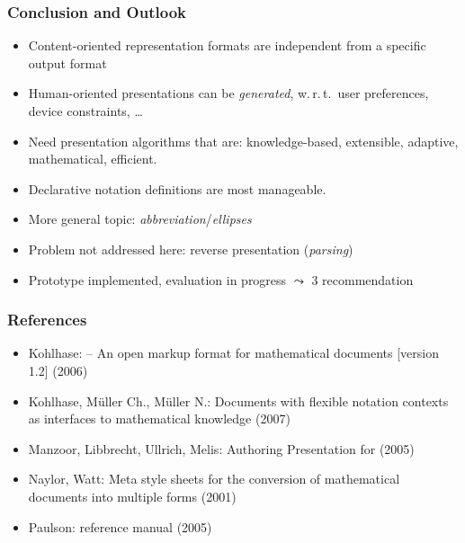 \documentclass[pdftex,xcolor=svgnames]{beamer}
\newcommand{\ExprColor}[1]{\textcolor[RGB]{38,134,102}{#1}}%
\begin{document}
\begin{frame}
  \frametitle{Conclusion and Outlook}
  \begin{itemize}
  \item Content-oriented representation formats are independent from a specific
    output format
  \item Human-oriented presentations can be \emph{generated}, w.\,r.\,t.\ user
    preferences, device constraints, \ldots
  \item Need presentation algorithms that are: knowledge-based, extensible,
    adaptive, mathematical, efficient.
  \item \ExprColor{Declarative} notation definitions are most manageable.
  \item More general topic: \emph{abbreviation}/\emph{ellipses}
  \item Problem not addressed here: reverse presentation (\emph{parsing})
  \item Prototype implemented, evaluation in progress\newline
    $\leadsto$ {\mathml} 3 recommendation
  \end{itemize}
\end{frame}


\begin{frame}
  \frametitle{References}
  \begin{itemize}
  \item Kohlhase: {\omdoc} -- An open markup format for mathematical documents
    [version 1.2] (2006)
  \item Kohlhase, Müller Ch., Müller N.: Documents with flexible notation
    contexts as interfaces to mathematical knowledge (2007)
  \item Manzoor, Libbrecht, Ullrich, Melis: Authoring Presentation for
    {\openmath} (2005)
  \item Naylor, Watt: Meta style sheets for the conversion of mathematical
    documents into multiple forms (2001)
  \item Paulson: {\isabelle} reference manual (2005)
  \end{itemize}
\end{frame}

\end{document}
